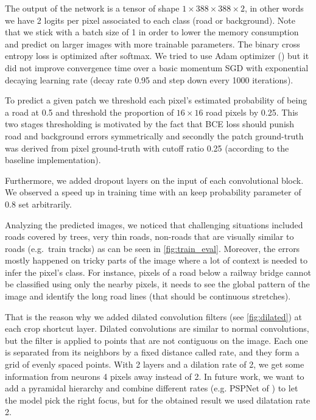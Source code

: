 \documentclass[10pt,conference,compsocconf]{IEEEtran}
\begin{document}
The output of the network is a tensor of shape $1\times388\times388\times2$, in other words we have 2 logits per pixel associated to each class (road or background). Note that we stick with a batch size of 1 in order to lower the memory consumption and predict on larger images with more trainable parameters. The binary cross entropy loss is optimized after softmax. We tried to use Adam optimizer (\citealp{kingma2014adam}) but it did not improve convergence time over a basic momentum SGD with exponential decaying learning rate (decay rate 0.95 and step down every 1000 iterations).

To predict a given patch we threshold each pixel's estimated probability of being a road at 0.5 and threshold the proportion of $16\times16$ road pixels by 0.25. This two stages thresholding is motivated by the fact that BCE loss should punish road and background errors symmetrically and secondly the patch ground-truth was derived from pixel ground-truth with cutoff ratio 0.25 (according to the baseline implementation).

Furthermore, we added dropout layers on the input of each convolutional block. We observed a speed up in training time with an keep probability parameter of $0.8$ set arbitrarily.

Analyzing the predicted images, we noticed that challenging situations included roads covered by trees, very thin roads, non-roads that are visually similar to roads (e.g.\ train tracks) as can be seen in \cref{fig:train_eval}. Moreover, the errors mostly happened on tricky parts of the image where a lot of context is needed to infer the pixel's class. For instance, pixels of a road below a railway bridge cannot be classified using only the nearby pixels, it needs to see the global pattern of the image and identify the long road lines (that should be continuous stretches).

That is the reason why we added dilated convolution filters (see \cref{fig:dilated}) at each crop shortcut layer. Dilated convolutions are similar to normal convolutions, but the filter is applied to points that are not contiguous on the image. Each one is separated from its neighbors by a fixed distance called rate, and they form a grid of evenly spaced points. With 2 layers and a dilation rate of 2, we get some information from neurons 4 pixels away instead of 2. In future work, we want to add a pyramidal hierarchy and combine different rates (e.g. PSPNet of \citealp{PSPNet}) to let the model pick the right focus, but for the obtained result we used dilatation rate 2.
\end{document}
